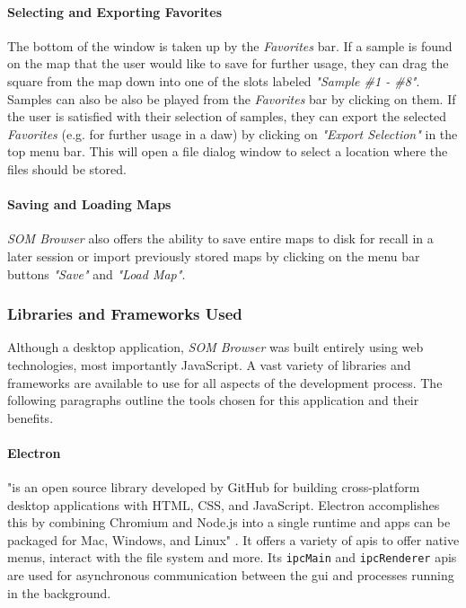 \paragraph*{Selecting and Exporting Favorites}
The bottom of the window is taken up by the \textit{Favorites} bar. If a sample
is found on the map that the user would like to save for further usage, they can
drag the square from the map down into one of the slots labeled
\textit{"Sample \#1 - \#8"}. Samples can also be also be played from the
\textit{Favorites} bar by clicking on them. If the user is satisfied with their
selection of samples, they can export the selected \textit{Favorites} (e.g. for
further usage in a \gls{daw}) by clicking on \textit{"Export Selection"} in the
top menu bar. This will open a file dialog window to select a location where the
files should be stored.

\paragraph*{Saving and Loading Maps}
\textit{SOM Browser} also offers the ability to save entire maps to disk for
recall in a later session or import previously stored maps by clicking on the
menu bar buttons \textit{"Save"} and \textit{"Load Map"}.

\subsubsection{Libraries and Frameworks Used}
\label{subsubsec:som-browser_libraries}
Although a desktop application, \textit{SOM Browser} was built entirely using
web technologies, most importantly JavaScript. A vast variety of libraries and
frameworks are available to use for all aspects of the development process.
The following paragraphs outline the tools chosen for this application and their
benefits.

\paragraph*{Electron}
\label{para:electron}
"is an open source library developed by GitHub for building cross-platform
desktop applications with HTML, CSS, and JavaScript. Electron accomplishes this
by combining Chromium and Node.js into a single runtime and apps can be
packaged for Mac, Windows, and Linux" \citep{electron2019}. It offers a variety
of \glspl{api} to offer native menus, interact with the file system and more.
Its \texttt{ipcMain} and \texttt{ipcRenderer} \glspl{api} are used for
asynchronous communication between the \gls{gui} and processes running in the
background.


